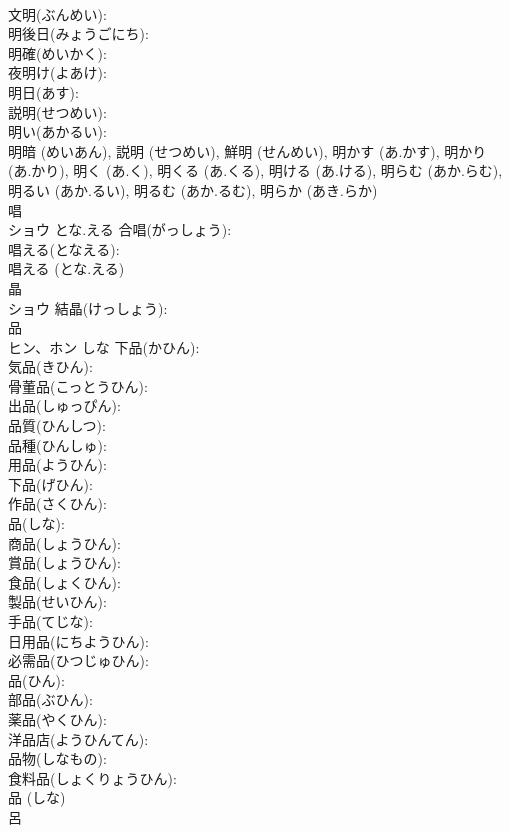 \documentclass[8pt]{extreport}
\begin{document}
\begin{CJK}{UTF8}{min}
\\	文明(ぶんめい): 
\\	明後日(みょうごにち): 
\\	明確(めいかく): 
\\	夜明け(よあけ): 
\\	明日(あす): 
\\	説明(せつめい): 
\\	明い(あかるい): 
\\	明暗 (めいあん), 説明 (せつめい), 鮮明 (せんめい), 明かす (あ.かす), 明かり (あ.かり), 明く (あ.く), 明くる (あ.くる), 明ける (あ.ける), 明らむ (あか.らむ), 明るい (あか.るい), 明るむ (あか.るむ), 明らか (あき.らか)
\\	唱			
\\	ショウ	とな.える	合唱(がっしょう): 
\\	唱える(となえる): 
\\	唱える (とな.える)
\\	晶			
\\	ショウ		結晶(けっしょう): 
\\	品			
\\	ヒン、ホン	しな	下品(かひん): 
\\	気品(きひん): 
\\	骨董品(こっとうひん): 
\\	出品(しゅっぴん): 
\\	品質(ひんしつ): 
\\	品種(ひんしゅ): 
\\	用品(ようひん): 
\\	下品(げひん): 
\\	作品(さくひん): 
\\	品(しな): 
\\	商品(しょうひん): 
\\	賞品(しょうひん): 
\\	食品(しょくひん): 
\\	製品(せいひん): 
\\	手品(てじな): 
\\	日用品(にちようひん): 
\\	必需品(ひつじゅひん): 
\\	品(ひん): 
\\	部品(ぶひん): 
\\	薬品(やくひん): 
\\	洋品店(ようひんてん): 
\\	品物(しなもの): 
\\	食料品(しょくりょうひん): 
\\	品 (しな)
\\	呂			

\end{CJK}
\end{document}
